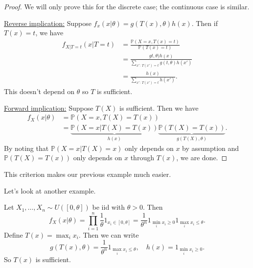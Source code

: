 \documentclass[egregdoesnotlikesansseriftitles,a4paper]{scrartcl}
\begin{document}
\begin{proof}
      We will only prove this for the discrete case; the continuous case is similar. 
      
      \underline{Reverse implication:} Suppose $f_{x}(x| \theta)=g (T (x), \theta)h (x)$. Then if $T (x)=t$, we have 
      \begin{align*}
           f_{X|T=t} (x|T=t)&= \frac{\mathbb{P}(X=x,T (x)=t)}{\mathbb{P}(T (x)=t)}\\
           &= \frac{g t, \theta)h (x)}{\sum_{x': \ T (x')=t}^{}g (t, \theta)h (x')}\\
           &=\frac{h (x)}{\sum_{x': \ T (x')=t}^{}h (x')}.
      \end{align*}
      This doesn't depend on $\theta$ so $T$ is sufficient.

      \underline{Forward implication:} Suppose $T (X)$ is sufficient. Then we have 
      \begin{align*}
           f_X (x| \theta)&=\mathbb{P} (X=x, T (X)=T (x))\\
           &=\underbrace{\mathbb{P}(X=x| T (X)=T (x))}_{h (x)} \underbrace{\mathbb{P}(T(X)=T (x))}_{g (T (X),\theta)}.
      \end{align*}
      By noting that $\mathbb{P}(X=x| T (X)=x)$ only depends on $x$ by assumption and $\mathbb{P}(T(X)=T (x))$ only depends on $x$ through $T (x)$, we are done.
\end{proof}
\begin{remark}
      This criterion makes our previous example much easier.
\end{remark}
Let's look at another example.
\begin{example*}
      Let $X_1 , \ldots ,X_n \sim U ([0, \theta])$ be iid with $\theta >0$. Then \[
      f_{X}(x| \theta)=\prod_{i=1}^{n}\frac{1}{\theta} 1_{x_{i} \in [0, \theta]}=\frac{1}{\theta^{n}} 1_{\min_i x_{i} \geq 0} 1_{\max_i x_{i} \leq \theta} 
      .\] Define $T (x)=\max_i x_i$. Then we can write \[
      g (T (x), \theta)=\frac{1}{\theta^{n}}1_{\max_i x_{i} \leq \theta} , \quad h (x)=1_{\min_i x_{i} \geq 0}
      .\] So $T (x)$ is sufficient.
\end{example*}
\end{document}
